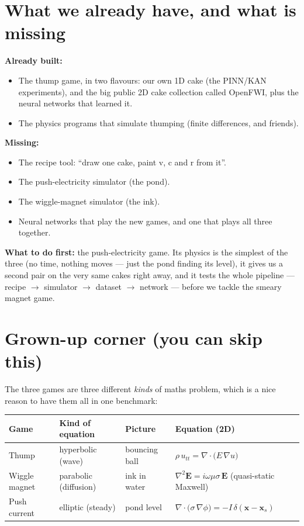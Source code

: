 \documentclass[11pt,a4paper]{article}
\begin{document}
\section*{What we already have, and what is missing}

\textbf{Already built:}
\begin{itemize}[leftmargin=2em]
  \item The \textcolor{seismic}{thump game}, in two flavours: our own 1D cake (the PINN/KAN experiments),
        and the big public 2D cake collection called OpenFWI, plus the neural networks that learned it.
  \item The physics programs that simulate thumping (finite differences, and friends).
\end{itemize}

\textbf{Missing:}
\begin{itemize}[leftmargin=2em]
  \item The recipe tool: ``draw one cake, paint v, c and r from it''.
  \item The \textcolor{electric}{push-electricity} simulator (the pond).
  \item The \textcolor{magnet}{wiggle-magnet} simulator (the ink).
  \item Neural networks that play the new games, and one that plays all three together.
\end{itemize}

\textbf{What to do first:} the \textcolor{electric}{push-electricity game}.
Its physics is the simplest of the three (no time, nothing moves --- just the pond finding its level),
it gives us a second pair on the very same cakes right away, and it tests the whole
pipeline --- recipe $\to$ simulator $\to$ dataset $\to$ network --- before we tackle the smeary magnet game.

\section*{Grown-up corner (you can skip this)}

The three games are three different \emph{kinds} of maths problem, which is a nice reason
to have them all in one benchmark:

\begin{center}
\begin{tabular}{@{}llll@{}}
\toprule
Game & Kind of equation & Picture & Equation (2D) \\
\midrule
\textcolor{seismic}{Thump} & hyperbolic (wave) & bouncing ball &
  $\rho\, u_{tt} = \nabla\!\cdot\!\big(E\,\nabla u\big)$ \\
\textcolor{magnet}{Wiggle magnet} & parabolic (diffusion) & ink in water &
  $\nabla^2 \mathbf{E} = i\omega\mu\sigma\,\mathbf{E}$ \quad (quasi-static Maxwell) \\
\textcolor{electric}{Push current} & elliptic (steady) & pond level &
  $\nabla\!\cdot\!\big(\sigma\,\nabla\phi\big) = -I\,\delta(\mathbf{x}-\mathbf{x}_s)$ \\
\bottomrule
\end{tabular}
\end{center}
\end{document}
